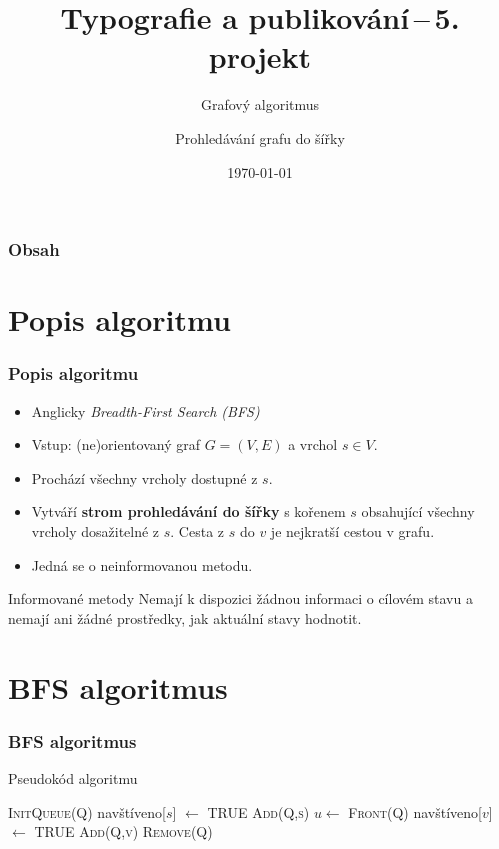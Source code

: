 \documentclass{beamer}[03-05-2023]
\title{Typografie a publikování\,--\,5. projekt}
\subtitle{Grafový algoritmus}
\author{Prohledávání grafu do šířky}
\date{\today}
\begin{document}
\frame{\titlepage}

\begin{frame}
    \frametitle{Obsah}
    \tableofcontents
\end{frame}

\section{Popis algoritmu}
\begin{frame}\frametitle{Popis algoritmu}
    \begin{itemize}
        \item Anglicky \emph{Breadth-First Search (BFS)}
        \item Vstup: (ne)orientovaný graf $G = (V, E)$ a vrchol $s \in V$.
        \item Prochází všechny vrcholy dostupné z $s$.
        \item Vytváří \textbf{strom prohledávání do šířky} s kořenem $s$ obsahující všechny vrcholy dosažitelné z $s$. Cesta z $s$ do $v$ je nejkratší cestou v grafu.
        \item Jedná se o neinformovanou metodu.
    \end{itemize}
    \begin{block}{Informované metody}
        Nemají k dispozici žádnou informaci o cílovém stavu a nemají ani žádné prostředky, jak aktuální stavy hodnotit.
    \end{block}
\end{frame}

\section{BFS algoritmus}
\begin{frame} \frametitle{BFS algoritmus}
    \begin{block}{Pseudokód algoritmu}
        \small
        \begin{algorithmic}[0]
            \State \textsc{InitQueue(Q)}
            \State navštíveno[$s$] $\gets$ \textsc{TRUE}
            \State \textsc{Add(Q,s)}
                \State $u \gets$ \textsc{Front(Q)}
                        \State navštíveno[$v$] $\gets$ \textsc{TRUE}
                        \State \textsc{Add(Q,v)}
                    \EndIf
                \EndFor
                \State \textsc{Remove(Q)}
            \EndWhile
            \EndProcedure
        \end{algorithmic}
    \end{block}
\end{frame}
\end{document}
